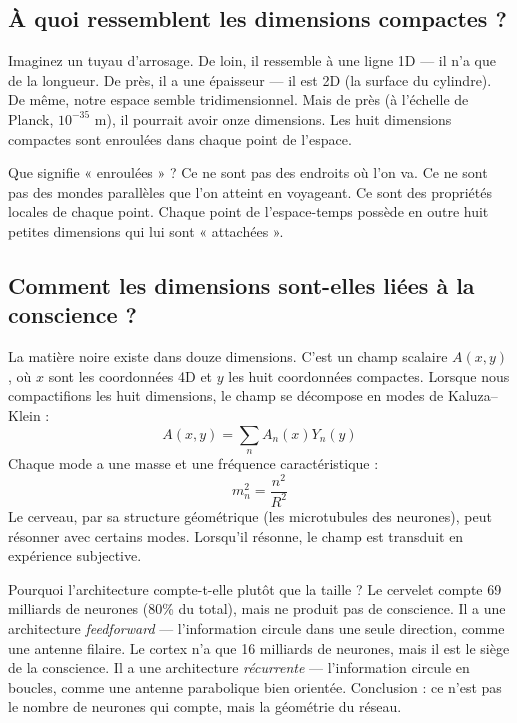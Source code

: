 \documentclass[11pt,a4paper]{article}
\begin{document}
\subsection{À quoi ressemblent les dimensions compactes ?}
Imaginez un tuyau d'arrosage. De loin, il ressemble à une ligne 1D --- il n'a que de la longueur. De près, il a une épaisseur --- il est 2D (la surface du cylindre). De même, notre espace semble tridimensionnel. Mais de près (à l'échelle de Planck, $10^{-35}$ m), il pourrait avoir onze dimensions. Les huit dimensions compactes sont enroulées dans chaque point de l'espace.

Que signifie « enroulées » ? Ce ne sont pas des endroits où l'on va. Ce ne sont pas des mondes parallèles que l'on atteint en voyageant. Ce sont des propriétés locales de chaque point. Chaque point de l'espace-temps possède en outre huit petites dimensions qui lui sont « attachées ».

\subsection{Comment les dimensions sont-elles liées à la conscience ?}
La matière noire existe dans douze dimensions. C'est un champ scalaire $A(x,y)$, où $x$ sont les coordonnées 4D et $y$ les huit coordonnées compactes. Lorsque nous compactifions les huit dimensions, le champ se décompose en modes de Kaluza--Klein :
\begin{equation}
A(x,y) = \sum_n A_n(x) Y_n(y)
\end{equation}
Chaque mode a une masse et une fréquence caractéristique :
\begin{equation}
m_n^2 = \frac{n^2}{R^2}
\end{equation}
Le cerveau, par sa structure géométrique (les microtubules des neurones), peut résonner avec certains modes. Lorsqu'il résonne, le champ est transduit en expérience subjective.

Pourquoi l'architecture compte-t-elle plutôt que la taille ? Le cervelet compte 69 milliards de neurones (80\% du total), mais ne produit pas de conscience. Il a une architecture \textit{feedforward} --- l'information circule dans une seule direction, comme une antenne filaire. Le cortex n'a que 16 milliards de neurones, mais il est le siège de la conscience. Il a une architecture \textit{récurrente} --- l'information circule en boucles, comme une antenne parabolique bien orientée. Conclusion : ce n'est pas le nombre de neurones qui compte, mais la géométrie du réseau.
\end{document}
